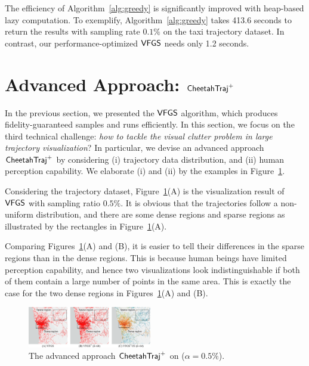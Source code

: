 The efficiency of Algorithm~\ref{alg:greedy} is significantly improved with heap-based lazy computation.
To exemplify, Algorithm~\ref{alg:greedy} takes 413.6 seconds to return the results with sampling rate $0.1\%$ on the \pt{} taxi trajectory dataset. In contrast, our performance-optimized $\mathsf{VFGS}$ needs only 1.2 seconds.


\section{Advanced Approach: $\mathsf{CheetahTraj}^{+}$}\label{sec:aa}

In the previous section, we presented the $\mathsf{VFGS}$ algorithm, which produces fidelity-guaranteed samples and runs efficiently. 
In this section, we focus on the third technical challenge: \emph{how to tackle the visual clutter problem in large trajectory visualization}?
In particular, we devise an advanced approach $\mathsf{CheetahTraj}^{+}$ by considering
(i) trajectory data distribution, and (ii) human perception capability.
We elaborate (i) and (ii) by the examples in Figure~\ref{fig:delta}.


 Considering the \pt{} trajectory dataset, Figure~\ref{fig:delta}(A) is the visualization result of $\mathsf{VFGS}$ with sampling ratio $0.5\%$. It is obvious that the trajectories follow a non-uniform distribution, and there are some dense regions and sparse regions as illustrated by the rectangles in Figure~\ref{fig:delta}(A).

      

 Comparing Figures~\ref{fig:delta}(A) and (B), it is easier to tell their differences in the sparse regions than in the dense regions. This is because human beings have limited  perception capability, and hence two visualizations look indistinguishable if both of them contain a large number of points in the same area. This is exactly the case for the two dense regions in Figures~\ref{fig:delta}(A) and (B).       




\begin{figure}%
	\centering
	\includegraphics[width=0.48\textwidth]{pictures/problemsolveing/delta_motivation.pdf}
	\caption{The advanced approach $\mathsf{CheetahTraj}^{+}$ on \pt{} ($\alpha = 0.5\%$).} 
	\label{fig:delta}
\end{figure}

